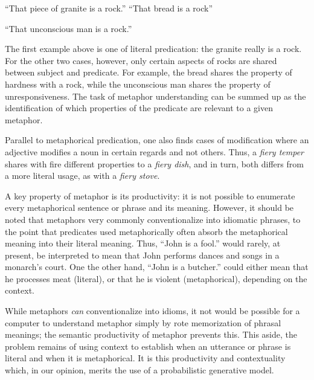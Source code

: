 \documentclass[10pt,letterpaper,twocolumn]{article}
\begin{document}
	\begin{exe}
	\ex
	 ``That piece of granite is a rock.'' 
	 \label{first}
	\ex
	 ``That bread is a rock''

	\ex

	 ``That unconscious man is a rock.'' 

	\label{third}
	\end{exe}

The first example above is one of literal predication: the granite really is a rock. For the other two cases, however, only certain aspects of rocks are shared between subject and predicate. For example, the bread shares the property of hardness with a rock, while the unconscious man shares the property of unresponsiveness. The task of metaphor understanding can be summed up as the identification of which properties of the predicate are relevant to a given metaphor.

Parallel to metaphorical predication, one also finds cases of modification where an adjective modifies a noun in certain regards and not others. Thus, a \emph{fiery temper} shares with fire different properties to a \emph{fiery dish}, and in turn, both differs from a more literal usage, as with a \emph{fiery stove}.

A key property of metaphor is its productivity: it is not possible to enumerate every metaphorical sentence or phrase and its meaning. However, it should be noted that metaphors very commonly conventionalize into idiomatic phrases, to the point that predicates used metaphorically often absorb the metaphorical meaning into their literal meaning. Thus, ``John is a fool.'' would rarely, at present, be interpreted to mean that John performs dances and songs in a monarch's court. One the other hand, ``John is a butcher.'' could either mean that he processes meat (literal), or that he is violent (metaphorical), depending on the context.

While metaphors \emph{can} conventionalize into idioms, it not would be possible for a computer to understand metaphor simply by rote memorization of phrasal meanings; the semantic productivity of metaphor prevents this. This aside, the problem remains of using context to establish when an utterance or phrase is literal and when it is metaphorical. It is this productivity and contextuality which, in our opinion, merits the use of a probabilistic generative model. 
\end{document}
